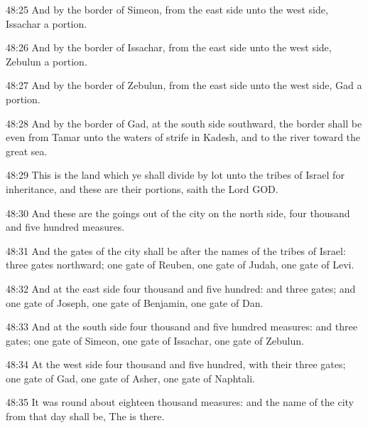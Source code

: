 48:25 And by the border of Simeon, from the east side unto the west side, Issachar a portion.

48:26 And by the border of Issachar, from the east side unto the west side, Zebulun a portion.

48:27 And by the border of Zebulun, from the east side unto the west side, Gad a portion.

48:28 And by the border of Gad, at the south side southward, the border shall be even from Tamar unto the waters of strife in Kadesh, and to the river toward the great sea.

48:29 This is the land which ye shall divide by lot unto the tribes of Israel for inheritance, and these are their portions, saith the Lord GOD.

48:30 And these are the goings out of the city on the north side, four thousand and five hundred measures.

48:31 And the gates of the city shall be after the names of the tribes of Israel: three gates northward; one gate of Reuben, one gate of Judah, one gate of Levi.

48:32 And at the east side four thousand and five hundred: and three gates; and one gate of Joseph, one gate of Benjamin, one gate of Dan.

48:33 And at the south side four thousand and five hundred measures: and three gates; one gate of Simeon, one gate of Issachar, one gate of Zebulun.

48:34 At the west side four thousand and five hundred, with their three gates; one gate of Gad, one gate of Asher, one gate of Naphtali.

48:35 It was round about eighteen thousand measures: and the name of the city from that day shall be, The \LORD is there.


